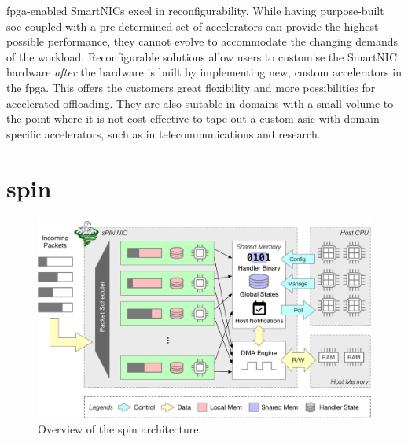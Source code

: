 \ac{fpga}-enabled SmartNICs excel in reconfigurability.  While having purpose-built \ac{soc} coupled with a pre-determined set of accelerators can provide the highest possible performance, they cannot evolve to accommodate the changing demands of the workload.  Reconfigurable solutions allow users to customise the SmartNIC hardware \emph{after} the hardware is built by implementing new, custom accelerators in the \ac{fpga}.  This offers the customers great flexibility and more possibilities for accelerated offloading.  They are also suitable in domains with a small volume to the point where it is not cost-effective to tape out a custom \ac{asic} with domain-specific accelerators, such as in telecommunications and research.

\section{\acs{spin}} \label{sec:background-spin}

\begin{figure}[tp]
    \centering
    \includegraphics[width=\textwidth]{thesis/figures/spin-arch.pdf}
    \caption{Overview of the \ac{spin} architecture.}
    \label{fig:spin-arch}
\end{figure}

